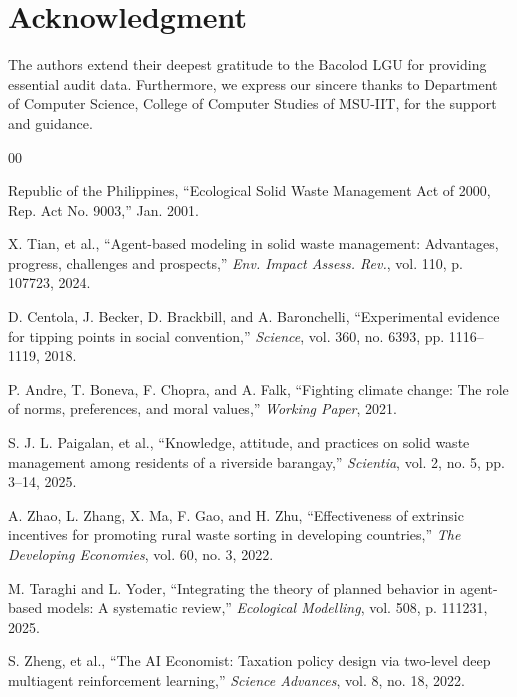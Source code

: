 \documentclass[conference,a4paper]{IEEEtran}
\begin{document}
\section*{Acknowledgment}
The authors extend their deepest gratitude to the Bacolod LGU for providing essential audit data. Furthermore, we express our sincere thanks to Department of Computer Science, College of Computer Studies of MSU-IIT, for the support and guidance.

\begin{thebibliography}{00}

 Republic of the Philippines, ``Ecological Solid Waste Management Act of 2000, Rep. Act No. 9003,'' Jan. 2001.

 X. Tian, et al., ``Agent-based modeling in solid waste management: Advantages, progress, challenges and prospects,'' \textit{Env. Impact Assess. Rev.}, vol. 110, p. 107723, 2024.

 D. Centola, J. Becker, D. Brackbill, and A. Baronchelli, ``Experimental evidence for tipping points in social convention,'' \textit{Science}, vol. 360, no. 6393, pp. 1116--1119, 2018.

 P. Andre, T. Boneva, F. Chopra, and A. Falk, ``Fighting climate change: The role of norms, preferences, and moral values,'' \textit{Working Paper}, 2021.

 S. J. L. Paigalan, et al., ``Knowledge, attitude, and practices on solid waste management among residents of a riverside barangay,'' \textit{Scientia}, vol. 2, no. 5, pp. 3--14, 2025.

 A. Zhao, L. Zhang, X. Ma, F. Gao, and H. Zhu, ``Effectiveness of extrinsic incentives for promoting rural waste sorting in developing countries,'' \textit{The Developing Economies}, vol. 60, no. 3, 2022.

 M. Taraghi and L. Yoder, ``Integrating the theory of planned behavior in agent-based models: A systematic review,'' \textit{Ecological Modelling}, vol. 508, p. 111231, 2025.

 S. Zheng, et al., ``The AI Economist: Taxation policy design via two-level deep multiagent reinforcement learning,'' \textit{Science Advances}, vol. 8, no. 18, 2022.

\end{thebibliography}
\end{document}

